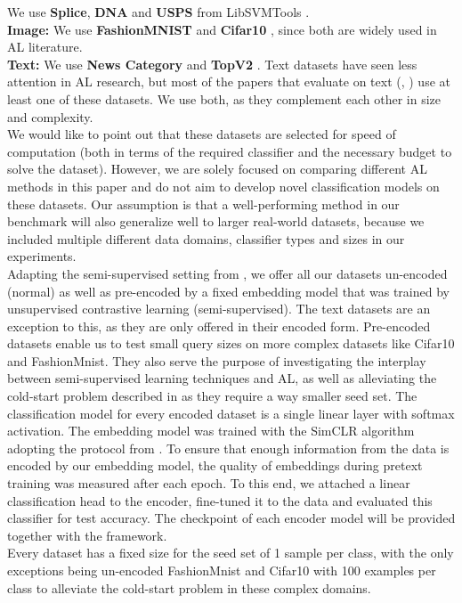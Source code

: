 \documentclass[]{article}
\begin{document}
We use \textbf{Splice}, \textbf{DNA} and \textbf{USPS} from LibSVMTools \cite{libsvmtools}.\\
\textbf{Image:}
We use \textbf{FashionMNIST} \cite{xiao2017fashion} and \textbf{Cifar10} \cite{krizhevsky2009learning}, since both are widely used in AL literature.\\
\textbf{Text:}
We use \textbf{News Category} \cite{misra2022news} and \textbf{TopV2} \cite{chen-etal-2020-low-resource}.
Text datasets have seen less attention in AL research, but most of the papers that evaluate on text (\cite{hu2021towards}, \cite{zhou2021towards}) use at least one of these datasets. 
We use both, as they complement each other in size and complexity. \\ [1mm]
%
We would like to point out that these datasets are selected for speed of computation (both in terms of the required classifier and the necessary budget to solve the dataset). 
However, we are solely focused on comparing different AL methods in this paper and do not aim to develop novel classification models on these datasets.
Our assumption is that a well-performing method in our benchmark will also generalize well to larger real-world datasets, because we included multiple different data domains, classifier types and sizes in our experiments. \\ [1mm]
Adapting the semi-supervised setting from \cite{hacohen2022active}, we offer all our datasets un-encoded (normal) as well as pre-encoded by a fixed embedding model that was trained by unsupervised contrastive learning (semi-supervised).
The text datasets are an exception to this, as they are only offered in their encoded form.
Pre-encoded datasets enable us to test small query sizes on more complex datasets like Cifar10 and FashionMnist.
They also serve the purpose of investigating the interplay between semi-supervised learning techniques and AL, as well as alleviating the cold-start problem described in \cite{luth2024navigating} as they require a way smaller seed set.
The classification model for every encoded dataset is a single linear layer with softmax activation.
The embedding model was trained with the SimCLR \cite{chen2020simple} algorithm adopting the protocol from \cite{hacohen2022active}. 
To ensure that enough information from the data is encoded by our embedding model, the quality of embeddings during pretext training was measured after each epoch.
To this end, we attached a linear classification head to the encoder, fine-tuned it to the data and evaluated this classifier for test accuracy. 
The checkpoint of each encoder model will be provided together with the framework. \\ [1mm]
Every dataset has a fixed size for the seed set of 1 sample per class, with the only exceptions being un-encoded FashionMnist and Cifar10 with 100 examples per class to alleviate the cold-start problem in these complex domains. 
\end{document}

